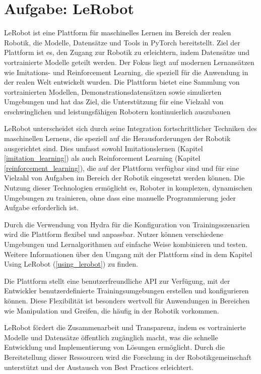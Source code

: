 \documentclass[a4paper, 12pt]{article}
\begin{document}
\section{Aufgabe: LeRobot} \label{lerobot}
LeRobot ist eine Plattform für maschinelles Lernen im Bereich der realen Robotik, die Modelle, Datensätze und Tools in PyTorch bereitstellt. Ziel der Plattform ist es, den Zugang zur Robotik zu erleichtern, indem Datensätze und vortrainierte Modelle geteilt werden. Der Fokus liegt auf modernen Lernansätzen wie Imitations- und Reinforcement Learning, die speziell für die Anwendung in der realen Welt entwickelt wurden. Die Plattform bietet eine Sammlung von vortrainierten Modellen, Demonstrationsdatensätzen sowie simulierten Umgebungen und hat das Ziel, die Unterstützung für eine Vielzahl von erschwinglichen und leistungsfähigen Robotern kontinuierlich auszubauen 

LeRobot unterscheidet sich durch seine Integration fortschrittlicher Techniken des maschinellen Lernens, die speziell auf die Herausforderungen der Robotik ausgerichtet sind. Dies umfasst sowohl Imitationslernen (Kapitel \ref{imitation_learning}) als auch  Reinforcement Learning (Kapitel \ref{reinforcement_learning}), die auf der Plattform verfügbar sind und für eine Vielzahl von Aufgaben im Bereich der Robotik eingesetzt werden können. Die Nutzung dieser Technologien ermöglicht es, Roboter in komplexen, dynamischen Umgebungen zu trainieren, ohne dass eine manuelle Programmierung jeder Aufgabe erforderlich ist. 

Durch die Verwendung von Hydra für die Konfiguration von Trainingsszenarien wird die Plattform flexibel und anpassbar. Nutzer können verschiedene Umgebungen und Lernalgorithmen auf einfache Weise kombinieren und testen. Weitere Informationen über den Umgang mit der Plattform sind in dem Kapitel Using LeRobot (\ref{using_lerobot}) zu finden.

Die Plattform stellt eine benutzerfreundliche API zur Verfügung, mit der Entwickler benutzerdefinierte Trainingsumgebungen erstellen und konfigurieren können. Diese Flexibilität ist besonders wertvoll für Anwendungen in Bereichen wie Manipulation und Greifen, die häufig in der Robotik vorkommen.

LeRobot fördert die Zusammenarbeit und Transparenz, indem es vortrainierte Modelle und Datensätze öffentlich zugänglich macht, was die schnelle Entwicklung und Implementierung von Lösungen ermöglicht. Durch die Bereitstellung dieser Ressourcen wird die Forschung in der Robotikgemeinschaft unterstützt und der Austausch von Best Practices erleichtert.
\end{document}
